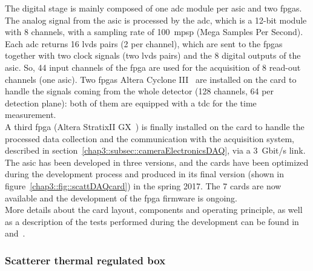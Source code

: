 The digital stage is mainly composed of one \gls{adc} module per \gls{asic} and two \glspl{fpga}. The analog signal from the \gls{asic} is processed by the \gls{adc}, which is a 12-bit module with 8 channels, with a sampling rate of 100~mpsp (Mega Samples Per Second). Each \gls{adc} returns 16 \gls{lvds} pairs (2 per channel), which are sent to the \glspl{fpga} together with two clock signals (two \gls{lvds} pairs) and the 8 digital outputs of the \gls{asic}. So, 44 input channels of the \gls{fpga} are used for the acquisition of 8 read-out channels (one \gls{asic}). Two \glspl{fpga} Altera Cyclone III~\parencite{Altera2012} are installed on the card to handle the signals coming from the whole detector (128 channels, 64 per detection plane): both of them are equipped with a \gls{tdc} for the time measurement.\\
A third \gls{fpga} (Altera StratixII GX~\parencite{Altera2009}) is finally installed on the card to handle the processed data collection and the communication with the acquisition system, described in section~\ref{chap3::subsec::cameraElectronicsDAQ}, via a 3~Gbit/s link.\\
The \gls{asic} has been developed in three versions, and the cards have been optimized during the development process and produced in its final version (shown in figure~\ref{chap3::fig::scattDAQcard}) in the spring 2017. The 7 cards are now available and the development of the \gls{fpga} firmware is ongoing.\\
More details about the card layout, components and operating principle, as well as a description of the tests performed during the development can be found in~\cite{Chen2017} and~\cite{Dahoumane2012}.    

\subsubsection{Scatterer thermal regulated box}\label{chap3::subsubsec::ScattThermBox}

